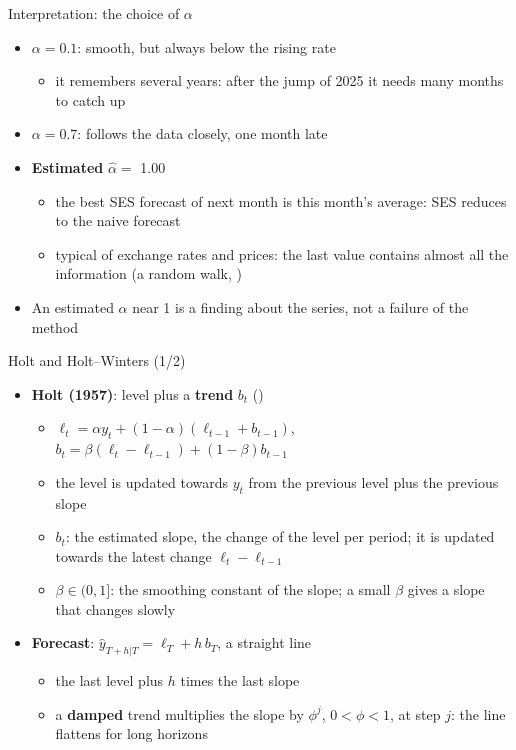 \begin{frame}{Interpretation: the choice of $\alpha$}
\itemsize{\small}
\begin{itemize}
    \item \textbf{$\alpha = 0.1$}: smooth, but always below the rising rate
    \begin{itemize}
        \item it remembers several years: after the jump of 2025 it needs many months to catch up
    \end{itemize}
    \item \textbf{$\alpha = 0.7$}: follows the data closely, one month late
    \item \textbf{Estimated} $\hat\alpha = $ 1.00
    \begin{itemize}
        \item the best SES forecast of next month is this month's average: SES reduces to the naive forecast
        \item typical of exchange rates and prices: the last value contains almost all the information (a random walk, )
    \end{itemize}
    \item An estimated $\alpha$ near 1 is a finding about the series, not a failure of the method
\end{itemize}
\end{frame}

\begin{frame}{Holt and Holt--Winters (1/2)}
\itemsize{\footnotesize}
\begin{itemize}
    \item \textbf{Holt (1957)}: level plus a \textbf{trend} $b_t$ ()
    \begin{itemize}
        \item $\ell_t = \alpha y_t + (1-\alpha)(\ell_{t-1} + b_{t-1})$, \ $b_t = \beta (\ell_t - \ell_{t-1}) + (1-\beta) b_{t-1}$
        \item the level is updated towards $y_t$ from the previous level plus the previous slope
        \item $b_t$: the estimated slope, the change of the level per period; it is updated towards the latest change $\ell_t - \ell_{t-1}$
        \item $\beta \in (0, 1]$: the smoothing constant of the slope; a small $\beta$ gives a slope that changes slowly
    \end{itemize}
    \item \textbf{Forecast}: $\hat y_{T+h|T} = \ell_T + h\, b_T$, a straight line
    \begin{itemize}
        \item the last level plus $h$ times the last slope
        \item a \textbf{damped} trend multiplies the slope by $\phi^j$, $0 < \phi < 1$, at step $j$: the line flattens for long horizons
    \end{itemize}
\end{itemize}
\end{frame}

